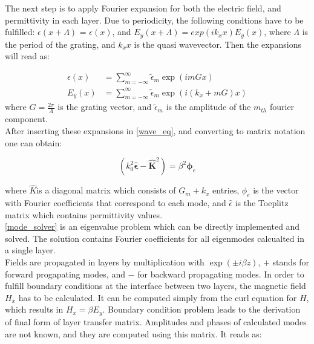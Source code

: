 \documentclass[a4paper,12pt]{scrartcl}
\begin{document}
    The next step is to apply Fourier expansion for both the electric field, and permittivity in each layer. Due to periodicity, the following condtions have to be fulfilled: $\epsilon(x + \Lambda)$ = $\epsilon(x)$, and $E_{y}(x + \Lambda) = exp(ik_{x}x)E_{y}(x)$, where $\Lambda$ is the period of the grating, and $k_{x}x$ is the quasi wavevector. Then the expansions will read as:
    
    \begin{align}
        \epsilon(x) &= \sum_{m=-\infty}^{\infty} \tilde{\epsilon}_{m}\exp(imGx)\\
        E_{y}(x) &= \sum_{m=-\infty}^{\infty} \tilde{\epsilon}_{m}\exp(i(k_{x} + mG)x)
    \label{expansions}
    \end{align}
    where $G = \frac{2\pi}{\Lambda}$ is the grating vector, and $\tilde\epsilon_{m}$ is the amplitude of the $m_{th}$ fourier component.\\
    After inserting these expansions in \autoref{wave_eq}, and converting to matrix notation one can obtain:
    
    \begin{equation}
        (k_{0}^2\boldsymbol{\hat{\epsilon}} - \boldsymbol{\hat{K}}^2) = \beta^2\boldsymbol{\phi}_{e}
    \label{mode_solver}
    \end{equation}
    
    where $\hat{K}$is a diagonal matrix which consists of $G_{m} + k_{x}$ entries, $\phi_{e}$ is the vector with Fourier coefficients that correspond to each mode, and $\hat{\epsilon}$ is the Toeplitz matrix which contains permittivity values.\\
    \autoref{mode_solver} is an eigenvalue problem which can be directly implemented and solved. The solution contains Fourier coefficients for all eigenmodes calcualted in a single layer.\\
    
    
    Fields are propagated in layers by multiplication with $\exp(\pm i\beta z)$, $+$ stands for forward progapating modes, and $-$ for backward propagating modes.
    In order to fulfill boundary conditions at the interface between two layers, the magnetic field $H_{x}$ has to be calculated. It can be computed simply from the curl equation for $H$, which results in $H_{x} = \beta E_{y}$. Boundary condition problem leads to the derivation of final form of layer transfer matrix. Amplitudes and phases of calculated modes are not known, and they are computed using this matrix. It reads as:
    
\end{document}

